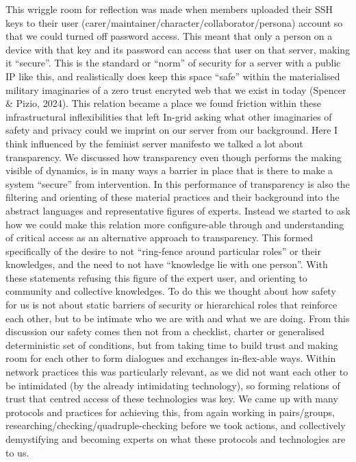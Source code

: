 This wriggle room for reflection was made when members uploaded their
SSH keys to their user (carer/maintainer/character/collaborator/persona)
account so that we could turned off password access. This meant that
only a person on a device with that key and its password can access that
user on that server, making it ``secure''. This is the standard or
``norm'' of security for a server with a public IP like this, and
realistically does keep this space ``safe'' within the materialised
military imaginaries of a zero trust encryted web that we exist in today
(Spencer \& Pizio, 2024). This relation became a place we found friction
within these infrastructural inflexibilities that left In-grid asking
what other imaginaries of safety and privacy could we imprint on our
server from our background. Here I think influenced by the feminist
server manifesto we talked a lot about transparency. We discussed how
transparency even though performs the making visible of dynamics, is in
many ways a barrier in place that is there to make a system ``secure''
from intervention. In this performance of transparency is also the
filtering and orienting of these material practices and their background
into the abstract languages and representative figures of experts.
Instead we started to ask how we could make this relation more
configure-able through and understanding of critical access as an
alternative approach to transparency. This formed specifically of the
desire to not ``ring-fence around particular roles'' or their
knowledges, and the need to not have ``knowledge lie with one person''.
With these statements refusing this figure of the expert user, and
orienting to community and collective knowledges. To do this we thought
about how safety for us is not about static barriers of security or
hierarchical roles that reinforce each other, but to be intimate who we
are with and what we are doing. From this discussion our safety comes
then not from a checklist, charter or generalised deterministic set of
conditions, but from taking time to build trust and making room for each
other to form dialogues and exchanges in-flex-able ways. Within network
practices this was particularly relevant, as we did not want each other
to be intimidated (by the already intimidating technology), so forming
relations of trust that centred access of these technologies was key. We
came up with many protocols and practices for achieving this, from again
working in pairs/groups, researching/checking/quadruple-checking before
we took actions, and collectively demystifying and becoming experts on
what these protocols and technologies are to us.

